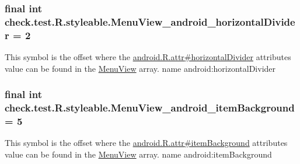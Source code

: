 \subsubsection[{Menu\+View\+\_\+android\+\_\+horizontal\+Divider}]{\setlength{\rightskip}{0pt plus 5cm}final int check.\+test.\+R.\+styleable.\+Menu\+View\+\_\+android\+\_\+horizontal\+Divider = 2\hspace{0.3cm}{\ttfamily [static]}}\label{classcheck_1_1test_1_1_r_1_1styleable_a46412e274f28015595ca468aa91c144f}
This symbol is the offset where the \hyperlink{}{android.\+R.\+attr\#horizontal\+Divider} attribute\textquotesingle{}s value can be found in the \hyperlink{classcheck_1_1test_1_1_r_1_1styleable_acb1b5275ffcfc132a3221b157fed1ff8}{Menu\+View} array.  name android\+:horizontal\+Divider \hypertarget{classcheck_1_1test_1_1_r_1_1styleable_a33a367daf559b4bb77461ec037d3e86f}{}
\subsubsection[{Menu\+View\+\_\+android\+\_\+item\+Background}]{\setlength{\rightskip}{0pt plus 5cm}final int check.\+test.\+R.\+styleable.\+Menu\+View\+\_\+android\+\_\+item\+Background = 5\hspace{0.3cm}{\ttfamily [static]}}\label{classcheck_1_1test_1_1_r_1_1styleable_a33a367daf559b4bb77461ec037d3e86f}
This symbol is the offset where the \hyperlink{}{android.\+R.\+attr\#item\+Background} attribute\textquotesingle{}s value can be found in the \hyperlink{classcheck_1_1test_1_1_r_1_1styleable_acb1b5275ffcfc132a3221b157fed1ff8}{Menu\+View} array.  name android\+:item\+Background \hypertarget{classcheck_1_1test_1_1_r_1_1styleable_ac4582a310c88c18ea4a50f11ff473f68}{}
